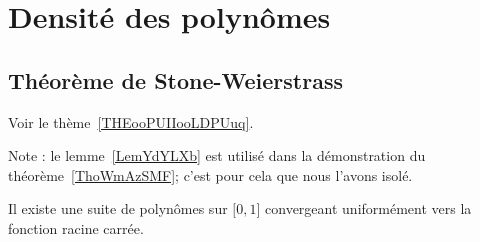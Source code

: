 \section{Densité des polynômes}

\subsection{Théorème de Stone-Weierstrass}

Voir le thème~\ref{THEooPUIIooLDPUuq}.

Note : le lemme~\ref{LemYdYLXb} est utilisé dans la démonstration du théorème~\ref{ThoWmAzSMF}; c'est pour cela que nous l'avons isolé.

\begin{lemma}       \label{LemYdYLXb}
    Il existe une suite de polynômes sur \( \mathopen[ 0 , 1 \mathclose]\) convergeant uniformément vers la fonction racine carrée.
\end{lemma}

